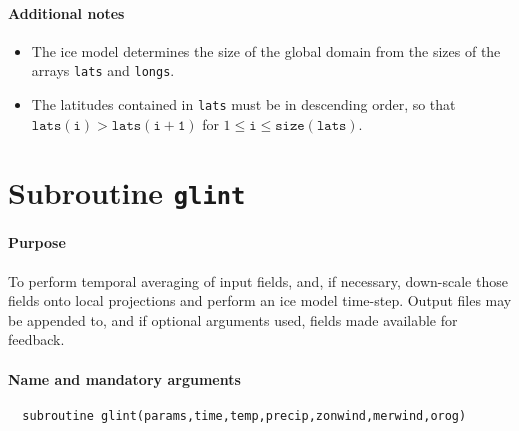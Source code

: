 \paragraph{Additional notes}
%
\begin{itemize}
\item The ice model determines the size of the global domain from the sizes of
  the arrays \texttt{lats} and \texttt{longs}.
\item The latitudes contained in \texttt{lats} must be in descending order, so
  that $\mathtt{lats(i)}>\mathtt{lats(i+1)}$ for $1\leq \mathtt{i} \leq
  \mathtt{size(lats)}$.
\end{itemize}
%
%
\newpage
\section{Subroutine \texttt{glint}}
%
\paragraph{Purpose}
%
To perform temporal averaging of input fields, and, if necessary, down-scale
those fields onto local projections and perform an ice model time-step. Output
files may be appended to, and if optional arguments used, fields made
available for feedback.
%
\paragraph{Name and mandatory arguments}
%
\begin{verbatim}
  subroutine glint(params,time,temp,precip,zonwind,merwind,orog)
\end{verbatim}
%
